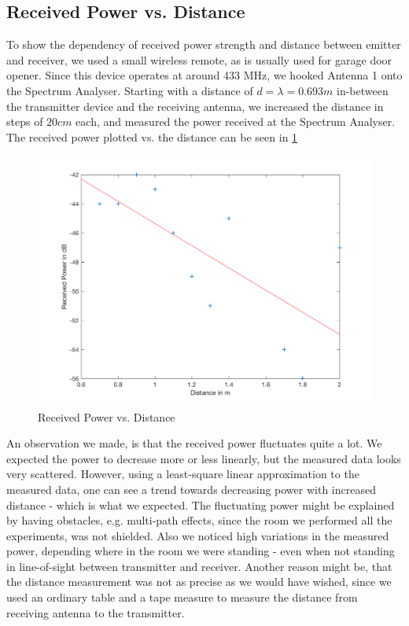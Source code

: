 \subsection{Received Power vs. Distance}
To show the dependency of received power strength and distance between emitter and receiver, we used a small wireless remote, as is usually used for garage door opener. Since this device operates at around 433 MHz, we hooked Antenna 1 onto the Spectrum Analyser. Starting with a distance of $d=\lambda=0.693m$ in-between the transmitter device and the receiving antenna, we increased the distance in steps of $20cm$ each, and measured the power received at the Spectrum Analyser.
The received power plotted vs. the distance can be seen in \cref{fig:omni}
\begin{figure}[h!]
	\centering
	\includegraphics[width=\textwidth/2+5em]{images/omnidir.png}
	\caption{Received Power vs. Distance}
	\label{fig:omni}
\end{figure}
An observation we made, is that the received power fluctuates quite a lot. We expected the power to decrease more or less linearly, but the measured data looks very scattered. However, using a least-square linear approximation to the measured data, one can see a trend towards decreasing power with increased distance - which is what we expected.
The fluctuating power might be explained by having obstacles, e.g. multi-path effects, since the room we performed all the experiments, was not shielded. Also we noticed high variations in the measured power, depending where in the room we were standing - even when not standing in line-of-sight between transmitter and receiver.
Another reason might be, that the distance measurement was not as precise as we would have wished, since we used an ordinary table and a tape measure to measure the distance from receiving antenna to the transmitter.




